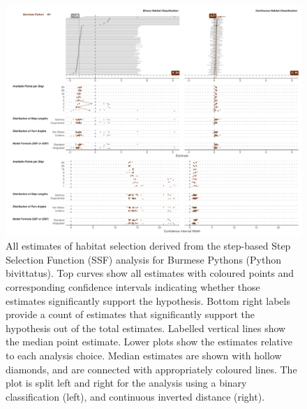 \documentclass[10pt,a4paper]{article}
\begin{document}
\begin{figure}[h]
\includegraphics[width=1\linewidth]{../../figures/specCurve_Burmese Python_ssf} \caption{All estimates of habitat selection derived from the step-based Step Selection Function (SSF) analysis for Burmese Pythons (Python bivittatus). Top curves show all estimates with coloured points and corresponding confidence intervals indicating whether those estimates significantly support the hypothesis. Bottom right labels provide a count of estimates that significantly support the hypothesis out of the total estimates. Labelled vertical lines show the median point estimate. Lower plots show the estimates relative to each analysis choice. Median estimates are shown with hollow diamonds, and are connected with appropriately coloured lines. The plot is split left and right for the analysis using a binary classification (left), and continuous inverted distance (right).}\label{fig:specCurveSsfPYBI}
\end{figure}
\end{document}
